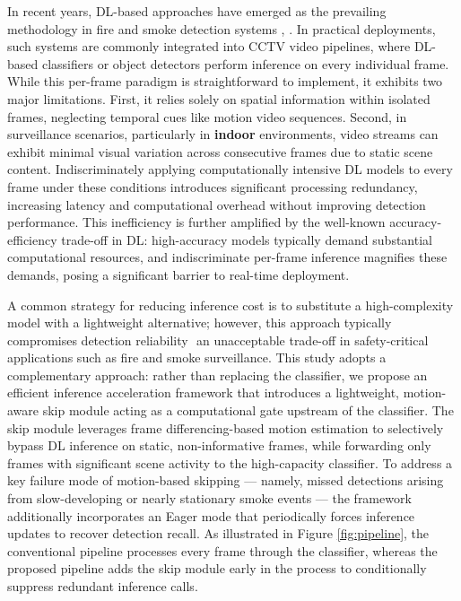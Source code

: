 \documentclass[
  10pt,
]{article}
\begin{document}
In recent years, DL-based approaches have emerged as the prevailing
methodology in fire and smoke detection systems
,
. In practical deployments,
such systems are commonly integrated into CCTV video pipelines, where
DL-based classifiers or object detectors perform inference on every
individual frame. While this per-frame paradigm is straightforward to
implement, it exhibits two major limitations. First, it relies solely on
spatial information within isolated frames, neglecting temporal cues
like motion video sequences. Second, in surveillance scenarios,
particularly in \textbf{indoor} environments, video streams can exhibit
minimal visual variation across consecutive frames due to static scene
content. Indiscriminately applying computationally intensive DL models
to every frame under these conditions introduces significant processing
redundancy, increasing latency and computational overhead without
improving detection performance. This inefficiency is further amplified
by the well-known accuracy-efficiency trade-off in DL: high-accuracy
models typically demand substantial computational resources, and
indiscriminate per-frame inference magnifies these demands, posing a
significant barrier to real-time deployment.

A common strategy for reducing inference cost is to substitute a
high-complexity model with a lightweight alternative; however, this
approach typically compromises detection reliability ­ an unacceptable
trade-off in safety-critical applications such as fire and smoke
surveillance. This study adopts a complementary approach: rather than
replacing the classifier, we propose an efficient inference acceleration
framework that introduces a lightweight, motion-aware skip module acting
as a computational gate upstream of the classifier. The skip module
leverages frame differencing-based motion estimation to selectively
bypass DL inference on static, non-informative frames, while forwarding
only frames with significant scene activity to the high-capacity
classifier. To address a key failure mode of motion-based skipping ---
namely, missed detections arising from slow-developing or nearly
stationary smoke events --- the framework additionally incorporates an
Eager mode that periodically forces inference updates to recover
detection recall. As illustrated in Figure \ref{fig:pipeline}, the
conventional pipeline processes every frame through the classifier,
whereas the proposed pipeline adds the skip module early in the process
to conditionally suppress redundant inference calls.
\end{document}
